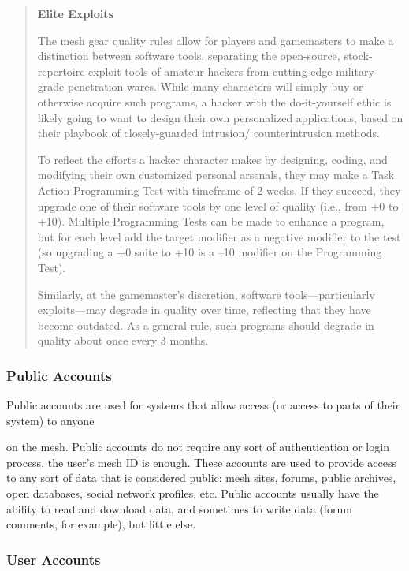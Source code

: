 \begin{quotation} \textbf{Elite Exploits} 

The mesh gear quality rules allow for players and gamemasters to make a distinction between software tools, separating the open-source, stock-repertoire exploit tools of amateur hackers from cutting-edge military-grade penetration wares. While many characters will simply buy or otherwise acquire such programs, a hacker with the do-it-yourself ethic is likely going to want to design their own personalized applications, based on their playbook of closely-guarded intrusion/ counterintrusion methods. 

To reflect the efforts a hacker character makes by designing, coding, and modifying their own customized personal arsenals, they may make a Task Action Programming Test with timeframe of 2 weeks. If they succeed, they upgrade one of their software tools by one level of quality (i.e., from +0 to +10). Multiple Programming Tests can be made to enhance a program, but for each level add the target modifier as a negative modifier to the test (so upgrading a +0 suite to +10 is a –10 modifier on the Programming Test). 

Similarly, at the gamemaster’s discretion, software tools—particularly exploits—may degrade in quality over time, reflecting that they have become outdated. As a general rule, such programs should degrade in quality about once every 3 months. \end{quotation} 

\subsubsection{Public Accounts} 

Public accounts are used for systems that allow access (or access to parts of their system) to anyone 

on the mesh. Public accounts do not require any sort of authentication or login process, the user's mesh ID is enough. These accounts are used to provide access to any sort of data that is considered public: mesh sites, forums, public archives, open databases, social network profiles, etc. Public accounts usually have the ability to read and download data, and sometimes to write data (forum comments, for example), but little else. 

\subsubsection{User Accounts} 

